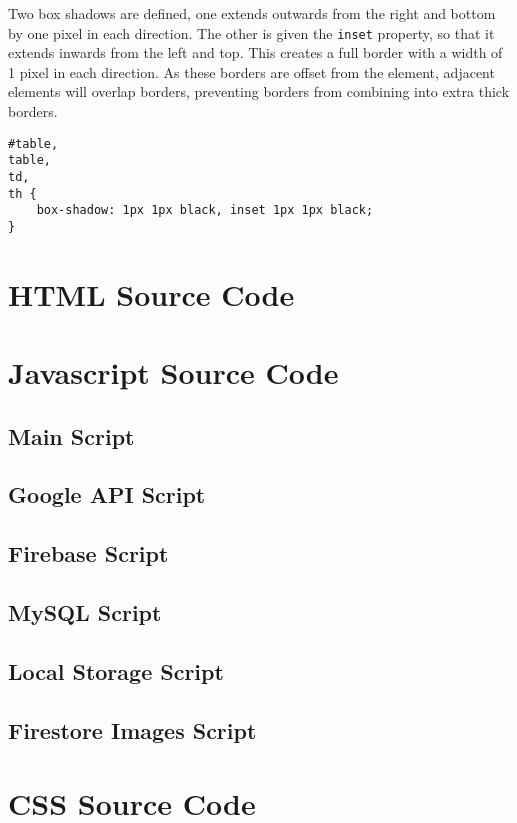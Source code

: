 \documentclass[letterpaper]{article}
\begin{document}
Two box shadows are defined, one extends outwards from the right and bottom by one pixel in each direction.
The other is given the \lstinline{inset} property, so that it extends inwards from the left and top.
This creates a full border with a width of 1 pixel in each direction.
As these borders are offset from the element, adjacent elements will overlap borders, preventing borders from combining into extra thick borders.

\begin{lstlisting}[firstnumber=69]
#table,
table,
td,
th {
    box-shadow: 1px 1px black, inset 1px 1px black;
}
\end{lstlisting}

\newpage

\appendix
\section{HTML Source Code}

\newpage

\section{Javascript Source Code}
\subsection{Main Script}

\newpage
\subsection{Google API Script}

\newpage
\subsection{Firebase Script}

\newpage
\subsection{MySQL Script}

\newpage
\subsection{Local Storage Script}

\newpage
\subsection{Firestore Images Script}

\newpage

\section{CSS Source Code}

\end{document}
